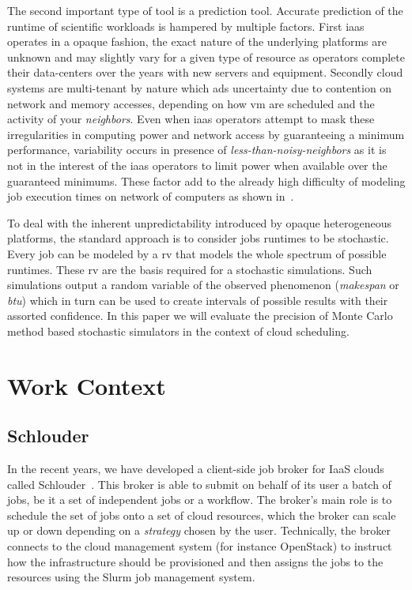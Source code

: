 \documentclass[10pt,conference,compsocconf]{IEEEtran}
\begin{document}
The second important  type of tool is a prediction  tool. Accurate prediction of
the  runtime of  scientific workloads  is  hampered by  multiple factors.  First
\ac{iaas}  operates in  a opaque  fashion, the  exact nature  of the  underlying
platforms are  unknown and  may slightly vary  for a given  type of  resource as
operators  complete their  data-centers  over  the years  with  new servers  and
equipment.   Secondly  cloud  systems  are  multi-tenant  by  nature  which  ads
uncertainty due to  contention on network and memory accesses,  depending on how
\ac{vm}  are scheduled  and the  activity of  your \emph{neighbors}.   Even when
\ac{iaas} operators attempt to mask  these irregularities in computing power and
network  access by  guaranteeing a  minimum performance,  variability occurs  in
presence of \emph{less-than-noisy-neighbors} as it is not in the interest of the
\ac{iaas} operators to limit power  when available over the guaranteed minimums.
These factor add to the already  high difficulty of modeling job execution times
on network of computers as shown in~\cite{Lastovetsky05}.

To deal  with the inherent  unpredictability introduced by  opaque heterogeneous
platforms, the standard approach is to  consider jobs runtimes to be stochastic.
Every job can be modeled by a \ac{rv} that models the whole spectrum of possible
runtimes. These  \ac{rv} are  the basis required  for a  stochastic simulations.
Such  simulations   output  a  random   variable  of  the   observed  phenomenon
(\emph{makespan}  or  \emph{\ac{btu}}) which  in  turn  can  be used  to  create
intervals of possible  results with their assorted confidence. In  this paper we
will evaluate the precision of Monte Carlo method based stochastic simulators in
the context of cloud scheduling.




\section{Work Context}

\subsection{Schlouder}
In the recent years, we have developed a client-side job broker for IaaS clouds
called Schlouder~\cite{Michon17}. This broker is able to submit on behalf of its
user a  batch of  jobs, be  it a  set of  independent jobs  or a  workflow.  The
broker's main role is to schedule the set of jobs onto a set of cloud resources,
which the broker can  scale up or down depending on  a \emph{strategy} chosen by
the user.  Technically, the broker connects  to the cloud management system (for
instance OpenStack) to  instruct how the infrastructure  should be provisioned
and  then assigns  the jobs  to  the resources  using the  Slurm job  management
system. 
\end{document}
